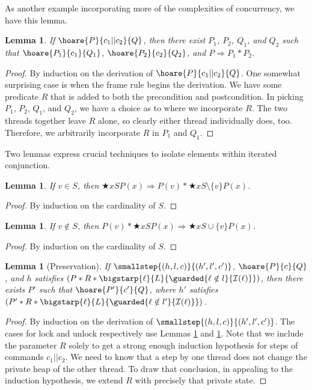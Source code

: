 \documentclass{amsbook}
\newtheorem{lemma}[theorem]{Lemma}
\theoremstyle{definition}
\theoremstyle{remark}
\numberwithin{section}{chapter}
\numberwithin{equation}{chapter}
\begin{document}
As another example incorporating more of the complexities of concurrency, we have this lemma.

\begin{lemma}
  If $\hoare{P}{c_1 || c_2}{Q}$, then there exist $P_1$, $P_2$, $Q_1$, and $Q_2$ such that $\hoare{P_1}{c_1}{Q_1}$, $\hoare{P_2}{c_2}{Q_2}$, and $P \Rightarrow P_1 * P_2$.
\end{lemma}
\begin{proof}
  By induction on the derivation of $\hoare{P}{c_1 || c_2}{Q}$.
  One somewhat surprising case is when the frame rule begins the derivation.
  We have some predicate $R$ that is added to both the precondition and postcondition.
  In picking $P_1$, $P_2$, $Q_1$, and $Q_2$, we have a choice as to where we incorporate $R$.
  The two threads together leave $R$ alone, so clearly either thread individually does, too.
  Therefore, we arbitrarily incorporate $R$ in $P_1$ and $Q_1$.
\end{proof}

Two lemmas express crucial techniques to isolate elements within iterated conjunction.

\begin{lemma}\label{chunkslock}
  If $v \in S$, then $\bigstar{x}{S}{P(x)} \Rightarrow P(v) * \bigstar{x}{S \setminus \{v\}}{P(x)}$.
\end{lemma}
\begin{proof}
  By induction on the cardinality of $S$.
\end{proof}

\begin{lemma}\label{chunksunlock}
  If $v \notin S$, then $P(v) * \bigstar{x}{S}{P(x)} \Rightarrow \bigstar{x}{S \cup \{v\}}{P(x)}$.
\end{lemma}
\begin{proof}
  By induction on the cardinality of $S$.
\end{proof}

\begin{lemma}[Preservation]\label{cslpreservation}
  If $\smallstep{(h, l, c)}{(h', l', c')}$, $\hoare{P}{c}{Q}$, and $h$ satisfies $(P * R * \bigstarp{\ell}{L}{\guarded{\ell \notin l}{\mathcal I(\ell)}})$, then there exists $P'$ such that $\hoare{P'}{c'}{Q}$, where $h'$ satisfies $(P' * R * \bigstarp{\ell}{L}{\guarded{\ell \notin l'}{\mathcal I(\ell)}})$.
\end{lemma}
\begin{proof}
  By induction on the derivation of $\smallstep{(h, l, c)}{(h', l', c')}$.
  The cases for lock and unlock respectively use Lemmas \ref{chunkslock} and \ref{chunksunlock}.
  Note that we include the parameter $R$ solely to get a strong enough induction hypothesis for steps of commands $c_1 || c_2$.
  We need to know that a step by one thread does not change the private heap of the other thread.
  To draw that conclusion, in appealing to the induction hypothesis, we extend $R$ with precisely that private state.
\end{proof}
\end{document}
